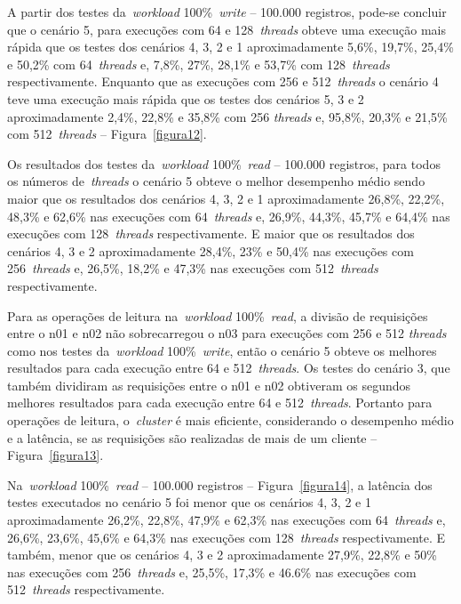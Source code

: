\documentclass[12pt]{article}
\begin{document}
A partir dos testes da~\emph{workload} 100\%~\emph{write} -- 100.000 registros, pode-se concluir que o cenário 5, para execuções com 64 e 128~\emph{threads} obteve uma execução mais rápida que os testes dos cenários 4, 3, 2 e 1 aproximadamente 5,6\%, 19,7\%, 25,4\% e 50,2\% com 64~\emph{threads} e, 7,8\%, 27\%, 28,1\% e 53,7\% com 128~\emph{threads} respectivamente. Enquanto que as execuções com 256 e 512~\emph{threads} o cenário 4 teve uma execução mais rápida que os testes dos cenários 5, 3 e 2 aproximadamente 2,4\%, 22,8\% e 35,8\% com 256 \emph{threads} e, 95,8\%, 20,3\% e 21,5\% com 512~\emph{threads} -- Figura~\ref{figura12}.

Os resultados dos testes da~\emph{workload} 100\%~\emph{read} -- 100.000 registros, para todos os números de~\emph{threads} o cenário 5 obteve o melhor desempenho médio sendo maior que os resultados dos cenários 4, 3, 2 e 1 aproximadamente 26,8\%, 22,2\%, 48,3\% e 62,6\% nas execuções com 64~\emph{threads} e, 26,9\%, 44,3\%, 45,7\% e 64,4\% nas execuções com 128~\emph{threads} respectivamente. E maior que os resultados dos cenários 4, 3 e 2 aproximadamente 28,4\%, 23\% e 50,4\% nas execuções com 256~\emph{threads} e, 26,5\%, 18,2\% e 47,3\% nas execuções com 512~\emph{threads} respectivamente.

Para as operações de leitura na~\emph{workload} 100\%~\emph{read}, a divisão de requisições entre o n01 e n02 não sobrecarregou o n03 para execuções com 256 e 512 \emph{threads} como nos testes da~\emph{workload} 100\%~\emph{write}, então o cenário 5 obteve os melhores resultados para cada execução entre 64 e 512~\emph{threads}. Os testes do cenário 3, que também dividiram as requisições entre o n01 e n02 obtiveram os segundos melhores resultados para cada execução entre 64 e 512~\emph{threads}. Portanto para operações de leitura, o~\emph{cluster} é mais eficiente, considerando o desempenho médio e a latência, se as requisições são realizadas de mais de um cliente -- Figura~\ref{figura13}.

Na~\emph{workload} 100\%~\emph{read} -- 100.000 registros -- Figura~\ref{figura14}, a latência dos testes executados no cenário 5 foi menor que os cenários 4, 3, 2 e 1 aproximadamente 26,2\%, 22,8\%, 47,9\% e 62,3\% nas execuções com 64~\emph{threads} e, 26,6\%, 23,6\%, 45,6\% e 64,3\% nas execuções com 128~\emph{threads} respectivamente. E também, menor que os cenários 4, 3 e 2 aproximadamente 27,9\%, 22,8\% e 50\% nas execuções com 256~\emph{threads} e, 25,5\%, 17,3\% e 46.6\% nas execuções com 512~\emph{threads} respectivamente.
\end{document}
